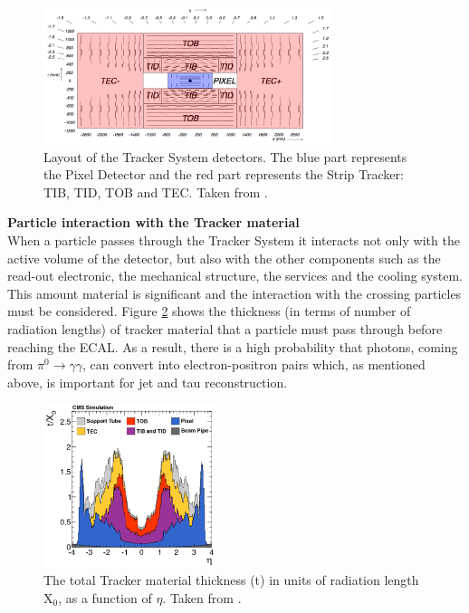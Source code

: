\begin{figure}[ht]
    \begin{center}
      \includegraphics[width=0.75\textwidth]{figuras/Chapter2/Tracker.png}
      \caption{Layout of the Tracker System detectors. The blue part represents 
      the Pixel Detector and the red part represents the Strip Tracker: TIB,
      TID, TOB and TEC. Taken from \cite{chp2:CMS}.} \label{figchp2:Tracker}
    \end{center}
 \end{figure}

\textbf{Particle interaction with the Tracker material} \\

\noindent When a particle passes through the Tracker System it interacts not only with the active volume
of the detector, but also with the other components such as the read-out electronic, 
the mechanical structure, the services and the cooling system. This amount material is significant
and the interaction with the crossing particles must be considered. Figure \ref{figchp2:Tracker_TrackerMaterial}
shows the thickness (in terms of number of radiation lengths) of tracker material that a particle must 
pass through before reaching the ECAL. As a result, there is a high probability that 
photons, coming from $\pi^{0} \rightarrow \gamma\gamma$, can convert into electron-positron 
pairs which, as mentioned above, is important for jet and tau reconstruction.

\begin{figure}[ht]
    \begin{center}
      \includegraphics[width=0.45\textwidth]{figuras/Chapter2/Tracker_Thickness.png}
      \caption{The total Tracker material thickness (t) in units of radiation length X$_{0}$, as a 
      function of $\eta$. Taken from \cite{TrackerPerformace}.
      } \label{figchp2:Tracker_TrackerMaterial}
    \end{center}
 \end{figure}

